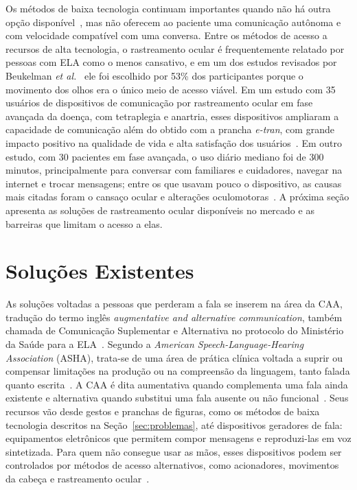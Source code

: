 Os métodos de baixa tecnologia continuam importantes quando não há outra opção disponível~\cite{zhang2017gazespeak}, mas não oferecem ao paciente uma comunicação autônoma e com velocidade compatível com uma conversa. Entre os métodos de acesso a recursos de alta tecnologia, o rastreamento ocular é frequentemente relatado por pessoas com \gls{ELA} como o menos cansativo, e em um dos estudos revisados por Beukelman \textit{et al.}~\cite{beukelman2011communication} ele foi escolhido por 53\% dos participantes porque o movimento dos olhos era o único meio de acesso viável. Em um estudo com 35 usuários de dispositivos de comunicação por rastreamento ocular em fase avançada da doença, com tetraplegia e anartria, esses dispositivos ampliaram a capacidade de comunicação além do obtido com a prancha \textit{e-tran}, com grande impacto positivo na qualidade de vida e alta satisfação dos usuários~\cite{caligari2013eye}. Em outro estudo, com 30 pacientes em fase avançada, o uso diário mediano foi de 300 minutos, principalmente para conversar com familiares e cuidadores, navegar na internet e trocar mensagens; entre os que usavam pouco o dispositivo, as causas mais citadas foram o cansaço ocular e alterações oculomotoras~\cite{spataro2014eye}. A próxima seção apresenta as soluções de rastreamento ocular disponíveis no mercado e as barreiras que limitam o acesso a elas.

\section{Soluções Existentes} \label{sec:solucoes_existentes}

As soluções voltadas a pessoas que perderam a fala se inserem na área da \gls{CAA}, tradução do termo inglês \textit{augmentative and alternative communication}, também chamada de Comunicação Suplementar e Alternativa no protocolo do Ministério da Saúde para a \gls{ELA}~\cite{pcdt_ela2020}. Segundo a \textit{American Speech-Language-Hearing Association} (ASHA), trata-se de uma área de prática clínica voltada a suprir ou compensar limitações na produção ou na compreensão da linguagem, tanto falada quanto escrita~\cite{asha_aac}. A \gls{CAA} é dita aumentativa quando complementa uma fala ainda existente e alternativa quando substitui uma fala ausente ou não funcional~\cite{asha_aac}. Seus recursos vão desde gestos e pranchas de figuras, como os métodos de baixa tecnologia descritos na Seção~\ref{sec:problemas}, até dispositivos geradores de fala: equipamentos eletrônicos que permitem compor mensagens e reproduzi-las em voz sintetizada. Para quem não consegue usar as mãos, esses dispositivos podem ser controlados por métodos de acesso alternativos, como acionadores, movimentos da cabeça e rastreamento ocular~\cite{beukelman2011communication}.

